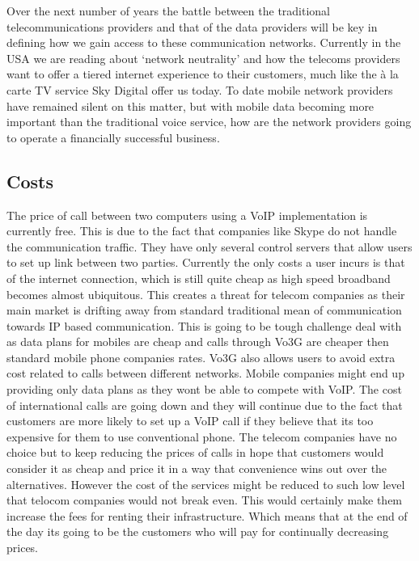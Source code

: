 Over the next number of years the battle between the traditional telecommunications providers and that of the data providers will be key in defining how we gain access to these communication networks. Currently in the USA we are reading about ‘network neutrality’ and how the telecoms providers want to offer a tiered internet experience to their customers, much like the à la carte TV service Sky Digital offer us today. To date mobile network providers have remained silent on this matter, but with mobile data becoming more important than the traditional voice service, how are the network providers going to operate a financially successful business.

\subsection{Costs}
The price of call between two computers using a VoIP implementation is currently free. This is due to the fact that companies like Skype do not handle the communication traffic. They have only several control servers that allow users to set up link between two parties. Currently the only costs a user incurs is that of the internet connection, which is still quite cheap as high speed broadband becomes almost ubiquitous. This creates a threat for telecom companies as their main market is drifting away from standard traditional mean of communication towards IP based communication. This is going to be tough challenge deal with as data plans for mobiles are cheap and calls through Vo3G are cheaper then standard mobile phone companies rates. Vo3G also allows users to avoid extra cost related to calls between different networks. Mobile companies might end up providing only data plans as they wont be able to compete with VoIP. The cost of international calls are going down and they will continue due to the fact that customers are more likely to set up a VoIP call if they believe that its too expensive for them to use conventional phone. The telecom companies have no choice but to keep reducing the prices of calls in hope that customers would consider it as cheap and price it in a way that convenience wins out over the alternatives. However the cost of the services might be reduced to such low level that telocom companies would not break even. This would certainly make them increase the fees for renting their infrastructure. Which means that at the end of the day its going to be the customers who will pay for continually decreasing prices.
